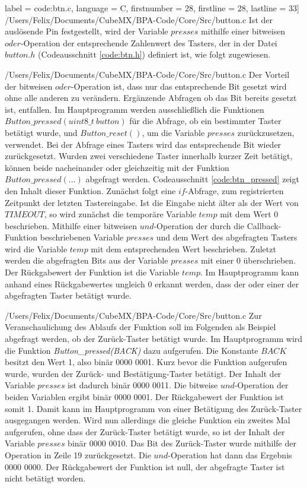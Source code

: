 label = code:btn.c, 
language = C, 
firstnumber = 28, 
firstline = 28, 
lastline = 33]
{/Users/Felix/Documents/CubeMX/BPA-Code/Core/Src/button.c}
Ist der auslösende Pin festgestellt, wird der Variable $presses$ mithilfe einer bitweisen $oder$-Operation der entsprechende Zahlenwert des Tasters, der in der Datei $button.h$ (Codeausschnitt \ref{code:btn.h}) definiert ist, wie folgt zugewiesen.

{/Users/Felix/Documents/CubeMX/BPA-Code/Core/Src/button.c}
Der Vorteil der bitweisen $oder$-Operation ist, dass nur das entsprechende Bit gesetzt wird ohne alle anderen zu verändern. Ergänzende Abfragen ob das Bit bereits gesetzt ist, entfallen.
Im Hauptprogramm werden ausschließlich die Funktionen $Button\_pressed(uint8\_t\ button)$ für die Abfrage, ob ein bestimmter Taster betätigt wurde, und $Button\_reset()$, um die Variable $presses$ zurückzusetzen, verwendet. Bei der Abfrage eines Tasters wird das entsprechende Bit wieder zurückgesetzt. Wurden zwei verschiedene Taster innerhalb kurzer Zeit betätigt, können beide nacheinander oder gleichzeitig mit der Funktion $Button\_pressed(...)$ abgefragt werden. Codeausschnitt \ref{code:btn_pressed} zeigt den Inhalt dieser Funktion. Zunächst folgt eine $if$-Abfrage, zum registrierten Zeitpunkt der letzten Tastereingabe. Ist die Eingabe nicht älter als der Wert von $TIMEOUT$, so wird zunächst die temporäre Variable $temp$ mit dem Wert 0 beschrieben. Mithilfe einer bitweisen $und$-Operation der durch die Callback-Funktion beschriebenen Variable $presses$ und dem Wert des abgefragten Tasters wird die Variable $temp$ mit dem entsprechenden Wert beschrieben. Zuletzt werden die abgefragten Bits aus der Variable $presses$ mit einer $0$ überschrieben. Der Rückgabewert der Funktion ist die Variable $temp$. Im Hauptprogramm kann anhand eines Rückgabewertes ungleich $0$ erkannt werden, dass der oder einer der abgefragten Taster betätigt wurde.

{/Users/Felix/Documents/CubeMX/BPA-Code/Core/Src/button.c}
Zur Veranschaulichung des Ablaufs der Funktion soll im Folgenden als Beispiel abgefragt werden, ob der Zurück-Taster betätigt wurde. Im Hauptprogramm wird die Funktion \textit{Button\_pressed(BACK)} dazu aufgerufen. Die Konstante $BACK$ besitzt den Wert 1, also binär 0000 0001. Kurz bevor die Funktion aufgerufen wurde, wurden der Zurück- und Bestätigung-Taster betätigt. Der Inhalt der Variable $presses$ ist dadurch binär 0000 0011. Die bitweise $und$-Operation der beiden Variablen ergibt binär 0000 0001. Der Rückgabewert der Funktion ist somit 1. Damit kann im Hauptprogramm von einer Betätigung des Zurück-Taster ausgegangen werden. Wird nun allerdings die gleiche Funktion ein zweites Mal aufgerufen, ohne dass der Zurück-Taster betätigt wurde, so ist der Inhalt der Variable $presses$ binär 0000 0010. Das Bit des Zurück-Taster wurde mithilfe der Operation in Zeile 19 zurückgesetzt. Die $und$-Operation hat dann das Ergebnis 0000 0000. Der Rückgabewert der Funktion ist null, der abgefragte Taster ist nicht betätigt worden.
